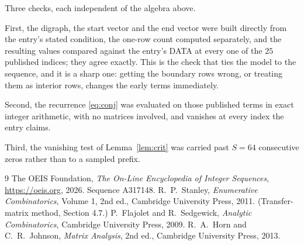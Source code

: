 \documentclass[11pt,a4paper]{article}
\theoremstyle{plain}
\theoremstyle{definition}
\begin{document}
Three checks, each independent of the algebra above.

First, the digraph, the start vector and the end vector were built directly from the
entry's stated condition, the one-row count computed separately, and the resulting values
compared against the entry's DATA at every one of the $25$ published indices; they
agree exactly. This is the check that ties the model to the sequence, and it is a sharp one:
getting the boundary rows wrong, or treating them as interior rows, changes the early terms
immediately.

Second, the recurrence \eqref{eq:conj} was evaluated on those published terms in exact
integer arithmetic, with no matrices involved, and vanishes at every index the entry claims.

Third, the vanishing test of Lemma~\ref{lem:crit} was carried past $S=64$ consecutive
zeros rather than to a sampled prefix.

\begin{thebibliography}{9}
 The OEIS Foundation, \emph{The On-Line Encyclopedia of Integer
Sequences}, \url{https://oeis.org}, 2026. Sequence A317148.
 R.~P.~Stanley, \emph{Enumerative Combinatorics}, Volume 1, 2nd ed.,
Cambridge University Press, 2011. (Transfer-matrix method, Section 4.7.)
 P.~Flajolet and R.~Sedgewick, \emph{Analytic Combinatorics}, Cambridge
University Press, 2009.
 R.~A.~Horn and C.~R.~Johnson, \emph{Matrix Analysis}, 2nd ed., Cambridge
University Press, 2013.
\end{thebibliography}
\end{document}
